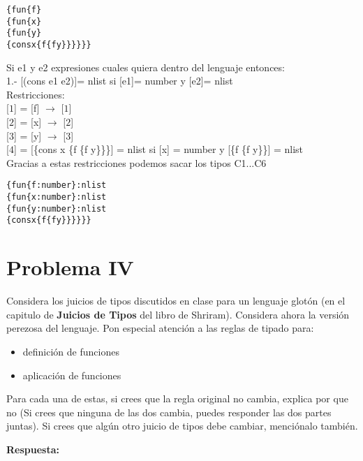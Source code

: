 \documentclass{article}
\begin{document}
\begin{alltt}
\{  fun \{f\}
  \{  fun \{x\}
    \{  fun \{y\}
      \{  cons  x   \{f \{f y\}\}\}\}\}\}
\end{alltt}

Si e1 y e2 expresiones cuales quiera dentro del lenguaje entonces:\\
 1.- [(cons e1 e2)]= nlist si [e1]= number y [e2]= nlist\\

Restricciones:\\

[$\boxed{1}$] = [f] $\rightarrow$ [$\boxed{1}$] \\

[$\boxed{2}$] = [x] $\rightarrow$ [$\boxed{2}$] \\

[$\boxed{3}$] = [y] $\rightarrow$ [$\boxed{3}$] \\

[$\boxed{4}$] = [\{cons x \{f \{f y\}\}\}] = nlist si [x] = number y [\{f \{f y\}\}] = nlist \\


Gracias a estas restricciones podemos sacar los tipos C1...C6
\begin{alltt}
\{fun \{f : number \} : nlist
  \{fun \{x : number \} : nlist
    \{fun \{y : number \} : nlist
      \{cons x \{f \{f y\}\}\}\}\}\}
\end{alltt}


\section*{Problema IV}
Considera los juicios de tipos discutidos en clase para un lenguaje glotón
(en el capitulo de \textbf{Juicios de Tipos} del libro de Shriram).
Considera ahora la versión perezosa del lenguaje. Pon especial atención a
las reglas de tipado para:

\begin{itemize}
\item definición de funciones
\item aplicación de funciones
\end{itemize}

Para cada una de estas, si crees que la regla original no cambia, explica por que no
(Si crees que ninguna de las dos cambia, puedes responder las dos partes juntas).
Si crees que algún otro juicio de tipos debe cambiar, menciónalo también.

{\bf Respuesta: }\\
\end{document}

